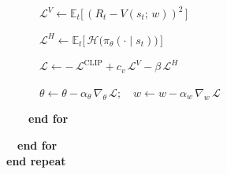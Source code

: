 \documentclass[11pt]{article}
\begin{document}
\begin{pseudobox}
\strut ~~~~~~\(\mathcal{L}^{V} \leftarrow \mathbb{E}_t\!\bigl[\, (R_t - V(s_t;\, w))^{2} \,\bigr]\)\\
\strut ~~~~~~\(\mathcal{L}^{H} \leftarrow \mathbb{E}_t\!\bigl[\, \mathcal{H}\bigl(\pi_\theta(\cdot \mid s_t)\bigr) \,\bigr]\)\\
\strut ~~~~~~\(\mathcal{L} \leftarrow -\,\mathcal{L}^{\text{CLIP}} + c_v\, \mathcal{L}^{V} - \beta\, \mathcal{L}^{H}\)\\
\strut ~~~~~~\(\theta \leftarrow \theta - \alpha_\theta\, \nabla_{\theta}\, \mathcal{L};\quad w \leftarrow w - \alpha_w\, \nabla_{w}\, \mathcal{L}\)\\
\strut ~~~~\textbf{end for}\\
\strut ~~\textbf{end for}\\
\textbf{end repeat}

\end{pseudobox}
\end{document}
